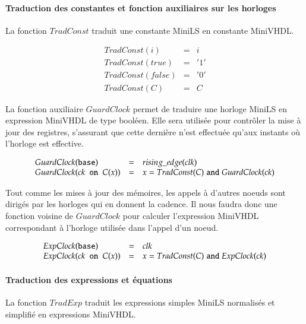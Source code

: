 \documentclass[9pt,a4paper]{article}
\newcommand{\mybox}[1]{\mbox{\tt{#1}}}
\newcommand{\Base}[0]{\mybox{base}}
\newcommand{\On}[3]{#1 \mybox{ on } #2 (#3)}
\begin{document}
\paragraph{Traduction des constantes et fonction auxiliaires sur les horloges}

La fonction $TradConst$ traduit une constante MiniLS en constante MiniVHDL.

\newcommand{\TradC}[1]{TradConst(#1)}

\[
\begin{array}{lcl}
  \TradC{i} & = & i \\
  \TradC{true} & = & '1' \\
  \TradC{false} & = & '0' \\
  \TradC{C} & = & C
\end{array}
\]

La fonction auxiliaire $GuardClock$ permet de traduire une horloge MiniLS en
expression MiniVHDL de type booléen. Elle sera utilisée pour contrôler la mise à
jour des registres, s'assurant que cette dernière n'est effectuée qu'aux
instants où l'horloge est effective.

\newcommand{\GEC}[1]{GuardClock(#1)}

\[
\begin{array}{lcl}
  \GEC{\Base} & = & rising\_edge(clk) \\
  \GEC{\On{ck}{C}{x}} & = & x = \TradC{C} \; \mathtt{and} \; \GEC{ck}
\end{array}
\]

Tout comme les mises à jour des mémoires, les appels à d'autres noeuds sont
dirigés par les horloges qui en donnent la cadence. Il nous faudra donc une
fonction voisine de $GuardClock$ pour calculer l'expression MiniVHDL
correspondant à l'horloge utilisée dans l'appel d'un noeud.

\newcommand{\EC}[1]{ExpClock(#1)}

\[
\begin{array}{lcl}
  \EC{\Base} & = & clk \\
  \EC{\On{ck}{C}{x}} & = & x = \TradC{C} \; \mathtt{and} \; \EC{ck}
\end{array}
\]

\paragraph{Traduction des expressions et équations}

La fonction $TradExp$ traduit les expressions simples MiniLS normalisés et
simplifié en expressions MiniVHDL.
\end{document}
